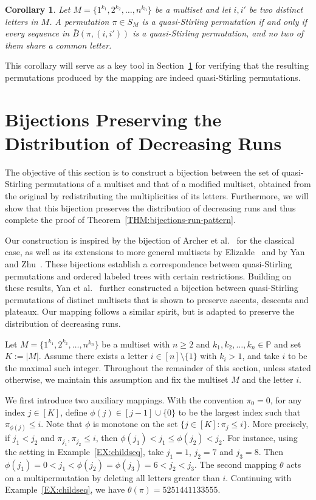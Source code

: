 \documentclass[11pt]{article}
\numberwithin{equation}{section}
\newtheorem{cor}[thm]{Corollary}
\def\bP{\mathbb P}
\begin{document}
\begin{cor}\label{COR:test-2}
	Let $M=\{1^{k_1},2^{k_2},\ldots,n^{k_n}\}$ be a multiset and let $i, i'$ be two distinct letters in $M$. A permutation $\pi\in S_M$ is a quasi-Stirling permutation if and only if every sequence in $\bar{B}(\pi,(i,i'))$ is a quasi-Stirling permutation, and no two of them share a common letter.
\end{cor}

This corollary will serve as a key tool in Section~\ref{SEC:bijections} for verifying that the resulting permutations produced by the mapping are indeed quasi-Stirling permutations.



\section{Bijections Preserving the Distribution of Decreasing Runs}\label{SEC:bijections}

The objective of this section is to construct a bijection between the set of quasi-Stirling permutations of a multiset and that of a modified multiset, obtained from the original by redistributing the multiplicities of its letters. Furthermore, we will show that this bijection preserves the distribution of decreasing runs and thus complete the proof of Theorem~\ref{THM:bijections-run-pattern}.


Our construction is inspired by the bijection of Archer et al.~\cite{Archer2019-1} for the classical case, as well as its extensions to more general multisets by Elizalde~\cite{Elizalde2021} and by Yan and Zhu~\cite{YanZhu2022}. These bijections establish a correspondence between quasi-Stirling permutations and ordered labeled trees with certain restrictions. Building on these results, Yan et al.~\cite{YanYangHuangZhu2022} further constructed a bijection between quasi-Stirling permutations of distinct multisets that is shown to preserve ascents, descents and plateaux. Our mapping follows a similar spirit, but is adapted to preserve the distribution of decreasing runs.


Let $M=\{1^{k_1},2^{k_2},\ldots,n^{k_n}\}$ be a multiset with $n\geq2$ and $k_1,k_2,\ldots,k_n\in\bP$ and set $K:=|M|$. Assume there exists a letter $i \in [n]\setminus\{1\}$ with $k_i > 1$, and take $i$ to be the maximal such integer. Throughout the remainder of this section, unless stated otherwise, we maintain this assumption and fix the multiset $M$ and the letter $i$.

We first introduce two auxiliary mappings. With the convention $\pi_0=0$, for any index $j\in[K]$, define $\phi(j)\in[j-1]\cup\{0\}$ to be the largest index such that $\pi_{\phi(j)}\leq i$. Note that $\phi$ is monotone on the set $\{j\in[K]: \pi_j\le i\}$. More precisely, if $j_1< j_2$ and $\pi_{j_1},\pi_{j_2}\leq i$, then $\phi(j_1)<j_1\leq\phi(j_2)<j_2$. For instance, using the setting in Example~\ref{EX:childseq}, take $j_1 = 1$, $j_2 = 7$ and $j_3 = 8$. Then $\phi(j_1)=0<j_1<\phi(j_2)=\phi(j_3)=6<j_2<j_3$. The second mapping $\theta$ acts on a multipermutation by deleting all letters greater than $i$. Continuing with Example~\ref{EX:childseq}, we have $\theta(\pi)=5251441133555$.
\end{document}
